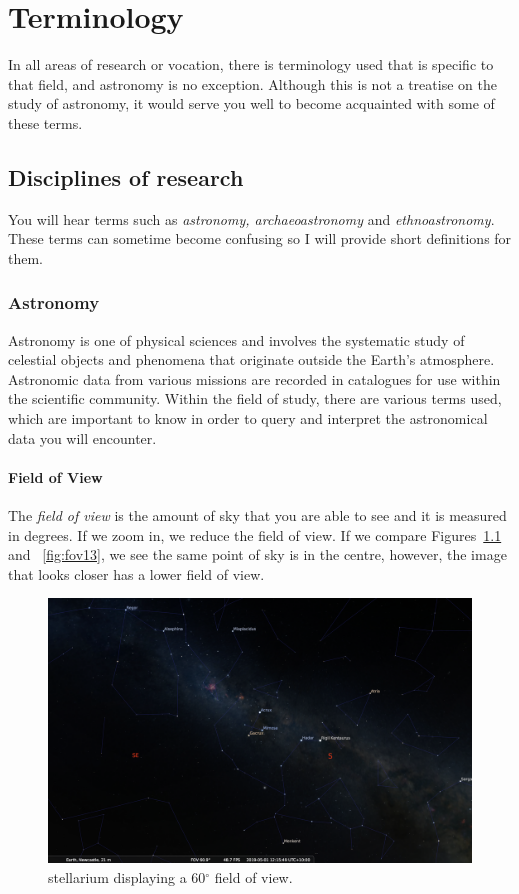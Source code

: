 
\chapter{Terminology}
In all areas of research or vocation, there is terminology used that is specific to that field, and astronomy is no exception. Although this is not a treatise on the study of astronomy, it would serve you well to become acquainted with some of these terms.

\section{Disciplines of research}

You will hear terms such as \textit{astronomy, archaeoastronomy} and \textit{ethnoastronomy}. These terms can sometime become confusing so I will provide short definitions for them.

\subsection{Astronomy}
Astronomy is one of physical sciences and involves the systematic study of celestial objects and phenomena that originate outside the Earth's atmosphere. Astronomic data from various missions are recorded in catalogues for use within the scientific community. Within the field of study, there are various terms used, which are important to know in order to query and interpret the astronomical data you will encounter.

\subsubsection{Field of View}
The \textit{field of view} is the amount of sky that you are able to see and it is measured in degrees.  If we zoom in, we reduce the field of view. If we compare Figures~\ref{fig:fov60} and ~\ref{fig:fov13}, we see the same point of sky is in the centre, however, the image that looks closer has a lower field of view.

\begin{figure}[htbp]
	\centering
	\includegraphics[width=1\columnwidth]{fov60}
	\caption{stellarium displaying a 60$^{\circ}$ field of view.}
	\label{fig:fov60}
\end{figure}

